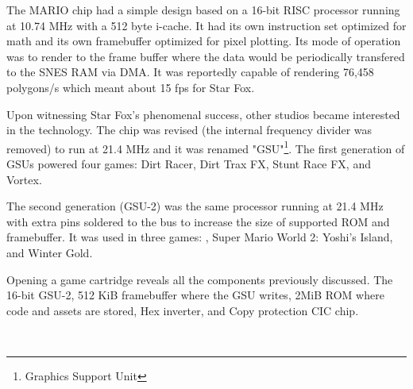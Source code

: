 \par
\vspace{20pt}
The MARIO chip had a simple design based on a 16-bit RISC processor running at 10.74 MHz with a 512 byte i-cache. It had its own instruction set optimized for math and its own framebuffer optimized for pixel plotting. Its mode of operation was to render to the frame buffer where the data would be periodically transfered to the SNES RAM via DMA. It was reportedly capable of rendering 76,458 polygons/s which meant about 15 fps for Star Fox.\\


\par
Upon witnessing Star Fox's phenomenal success, other studios became interested in the technology. The chip was revised (the internal frequency divider was removed) to run at 21.4 MHz and it was renamed "GSU"\footnote{Graphics Support Unit}. The first generation of GSUs powered four games: Dirt Racer, Dirt Trax FX, Stunt Race FX, and Vortex.\\
\par
 The second generation (GSU-2) was the same processor running at 21.4 MHz with extra pins soldered to the bus to increase the size of supported ROM and framebuffer. It was used in three games: \doom{}, Super Mario World 2: Yoshi's Island, and Winter Gold.\\
\par
Opening a \doom{} game cartridge reveals all the components previously discussed.  The 16-bit GSU-2,  512 KiB framebuffer where the GSU writes,  2MiB ROM where code and assets are stored,  Hex inverter, and  Copy protection CIC chip.







\vspace{10pt}
\\
\par

